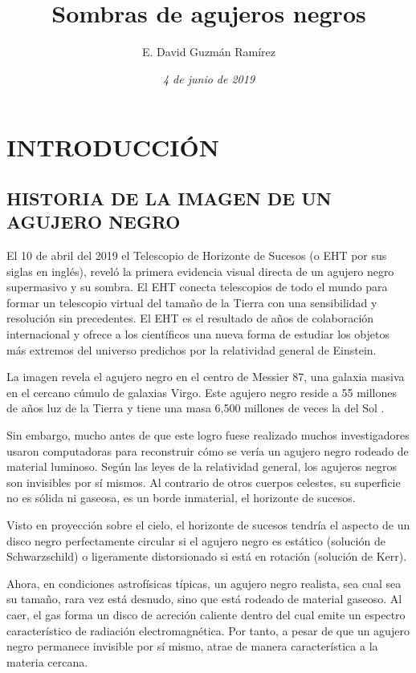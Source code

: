 \documentclass[11pt]{article}
\title{\textbf{{\Large Sombras de agujeros negros}}}
\author{E. David Guzmán Ramírez \vspace{-1em}}
\affil{Facultad de Ciencias, Universidad Nacional Autónoma de México \vspace{-0.5em}}
\date{\textit{{\normalsize 4 de junio de 2019}}}
\begin{document}
	
	
\maketitle
	
\section{INTRODUCCIÓN}

\subsection{HISTORIA DE LA IMAGEN DE UN AGUJERO NEGRO}


El 10 de abril del 2019 el Telescopio de Horizonte de Sucesos (o EHT por sus siglas en inglés), reveló la primera evidencia visual directa de un agujero negro supermasivo y su sombra. El EHT conecta telescopios de todo el mundo para formar un telescopio virtual del tamaño de la Tierra con una sensibilidad y resolución sin precedentes. El EHT es el resultado de años de colaboración internacional y ofrece a los científicos una nueva forma de estudiar los objetos más extremos del universo predichos por la relatividad general de Einstein. \medskip

La imagen revela el agujero negro en el centro de Messier 87, una galaxia masiva en el cercano cúmulo de galaxias Virgo. Este agujero negro reside a 55 millones de años luz de la Tierra y tiene una masa 6,500 millones de veces la del Sol \cite{EHT}. \medskip

Sin embargo, mucho antes de que este logro fuese realizado muchos investigadores usaron computadoras para reconstruir cómo se vería un agujero negro rodeado de material luminoso. Según las leyes de la relatividad general, los agujeros negros son invisibles por sí mismos. Al contrario de otros cuerpos celestes, su superficie no es sólida ni gaseosa, es un borde inmaterial, el horizonte de sucesos.\medskip

Visto en proyección sobre el cielo, el horizonte de sucesos tendría el aspecto de un disco negro perfectamente circular si el agujero negro es estático (solución de Schwarzschild) o ligeramente distorsionado si está en rotación (solución de Kerr).\medskip

Ahora, en condiciones astrofísicas típicas, un agujero negro realista, sea cual sea su tamaño, rara vez está desnudo, sino que está rodeado de material gaseoso. Al caer, el gas forma un disco de acreción caliente dentro del cual emite un espectro característico de radiación electromagnética. Por tanto, a pesar de que un agujero negro permanece invisible por sí mismo, atrae de manera característica a la materia cercana. \medskip
\end{document}
